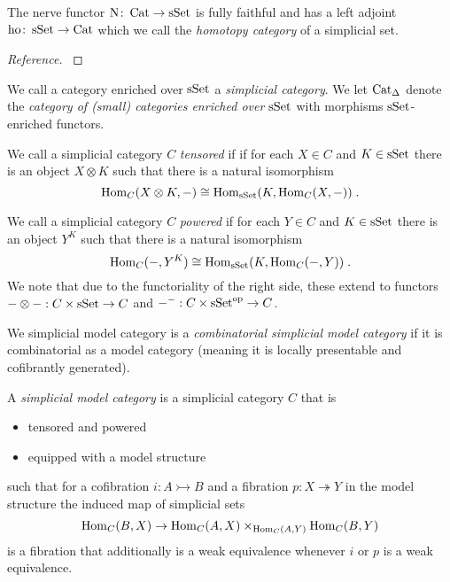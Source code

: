 \begin{lemma}
    The nerve functor $\operatorname{N}\colon\operatorname{Cat}\to\operatorname{sSet}$ is fully faithful and has a left adjoint $\operatorname{ho}\colon\operatorname{sSet}\to\operatorname{Cat}$ which we call the \emph{homotopy category} of a simplicial set.
    \begin{proof}[Reference]
        \cite[Proposition 1.2.2.1]{kerodon}
    \end{proof}
\end{lemma}
\begin{definition}
    We call a category enriched over $\operatorname{sSet}$ a \emph{simplicial category}.
    We let $\operatorname{Cat}_{\Delta}$ denote the \emph{category of (small) categories enriched over $\operatorname{sSet}$} with morphisms $\operatorname{sSet}$-enriched functors.
    
    We call a simplicial category $C$ \emph{tensored} if if for each $X\in C$ and $K\in\operatorname{sSet}$ there is an object $X\otimes K$ such that there is a natural isomorphism
    \begin{equation*}
        \operatorname{Hom}_C(X\otimes K,-)\cong\operatorname{Hom}_{\operatorname{sSet}}(K,\operatorname{Hom}_C(X,-))\;.
    \end{equation*}

    We call a simplicial category $C$ \emph{powered} if for each $Y\in C$ and $K\in\operatorname{sSet}$ there is an object $Y^K$ such that there is a natural isomorphism
    \begin{equation*}
        \operatorname{Hom}_C(-,Y^K)\cong\operatorname{Hom}_{\operatorname{sSet}}(K,\operatorname{Hom}_C(-,Y))\;.
    \end{equation*}
    We note that due to the functoriality of the right side, these extend to functors $-\otimes -:C\times\operatorname{sSet}\to C$ and $-^-:C\times\operatorname{sSet}^{\operatorname{op}}\to C$.

    We simplicial model category is a \emph{combinatorial simplicial model category} if it is combinatorial as a model category (meaning it is locally presentable and cofibrantly generated).
\end{definition}
\begin{definition}
    A \emph{simplicial model category} is a simplicial category $C$ that is 
    \begin{itemize}
        \item tensored and powered
        \item equipped with a model structure
    \end{itemize} 
    such that for a cofibration $i:A\rightarrowtail B$ and a fibration $p:X\twoheadrightarrow Y$ in the model structure the induced map of simplicial sets
    \begin{equation*}
        \operatorname{Hom}_C(B,X)\to\operatorname{Hom}_C(A,X)\times_{\operatorname{Hom}_C(A,Y)}\operatorname{Hom}_C(B,Y)
    \end{equation*}
    is a fibration that additionally is a weak equivalence whenever $i$ or $p$ is a weak equivalence.
\end{definition}
